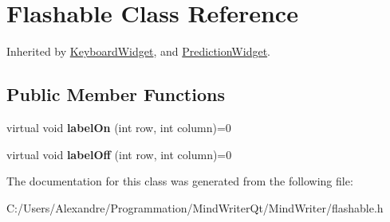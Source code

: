 \hypertarget{class_flashable}{\section{Flashable Class Reference}
\label{class_flashable}
}


Inherited by \hyperlink{class_keyboard_widget}{Keyboard\-Widget}, and \hyperlink{class_prediction_widget}{Prediction\-Widget}.

\subsection*{Public Member Functions}
\begin{DoxyCompactItemize}
\item 
\hypertarget{class_flashable_af435c1e2eb23db60a47188356968bd8b}{virtual void {\bfseries label\-On} (int row, int column)=0}\label{class_flashable_af435c1e2eb23db60a47188356968bd8b}

\item 
\hypertarget{class_flashable_a2ed7a541f1114ebf1b9cb0573398a417}{virtual void {\bfseries label\-Off} (int row, int column)=0}\label{class_flashable_a2ed7a541f1114ebf1b9cb0573398a417}

\end{DoxyCompactItemize}


The documentation for this class was generated from the following file\-:\begin{DoxyCompactItemize}
\item 
C\-:/\-Users/\-Alexandre/\-Programmation/\-Mind\-Writer\-Qt/\-Mind\-Writer/flashable.\-h\end{DoxyCompactItemize}
